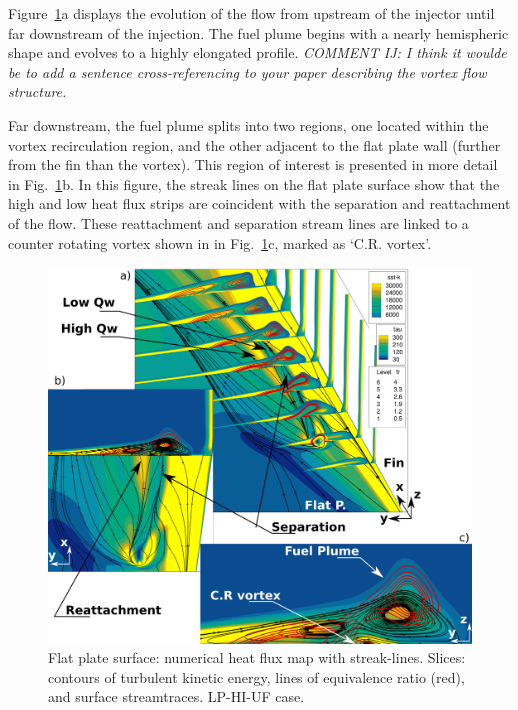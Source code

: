 \documentclass{AIAA}
\begin{document}
Figure~\ref{fig:Exper_Flowf}a displays the evolution of the flow from upstream of the injector until far downstream of  the injection.
The fuel plume begins with a nearly hemispheric shape and evolves to a highly elongated profile.
{\it COMMENT IJ: I think it woulde be to add a sentence cross-referencing to your paper describing the vortex flow structure.}
 
Far downstream, the fuel plume splits into two regions, one located within the vortex recirculation region, and the other adjacent to the flat plate wall (further from the fin than the vortex).
This region of interest is presented in more detail in Fig.~\ref{fig:Exper_Flowf}b.
In this figure, the streak lines on the flat plate surface show that the high and low heat flux strips are coincident with the separation and reattachment of the flow.
These reattachment and separation stream lines are linked to a counter rotating vortex shown in in Fig.~\ref{fig:Exper_Flowf}c, marked as `C.R. vortex'.


\begin{figure}[!h]
\center
\includegraphics[trim = 0mm 0mm 0mm 0mm, clip, width=0.95\columnwidth,valign=t]{Figures/Flowfield_Experimental_Vred_V2.pdf}
\caption{Flat plate surface: numerical heat flux map with streak-lines. Slices: contours of turbulent kinetic energy, lines of equivalence ratio (red), and surface streamtraces. LP-HI-UF case.}
\label{fig:Exper_Flowf}
\end{figure} 
\end{document}
